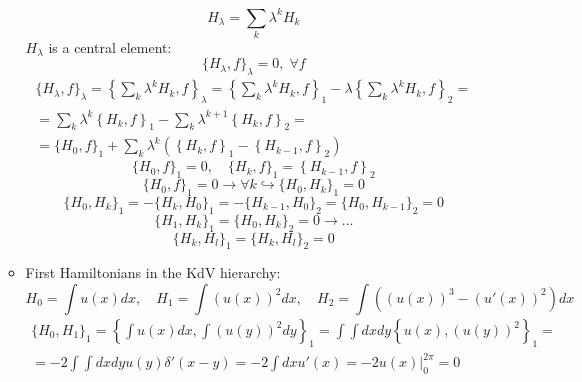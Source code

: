 \documentclass[12pt]{article}
\theoremstyle{definition}
\begin{document}
\begin{enumerate}
\begin{itemize}
\begin{equation}
        \end{equation}
        \begin{equation}
            H_\lambda=\sum\limits_k\lambda^kH_k
        \end{equation}
        $H_\lambda$ is a central element:
        \begin{equation}
            \{H_\lambda,f\}_\lambda= 0,\;\forall f
        \end{equation}
        \begin{multline}
            \{H_\lambda,f\}_\lambda=\left\{\sum_{k}\lambda^k H_k ,f\right\}_\lambda=\left\{\sum_{k}\lambda^k H_k ,f\right\}_1-\lambda\left\{\sum_{k}\lambda^k H_k ,f\right\}_2=\\=\sum_{k}\lambda^k\left\{ H_k ,f\right\}_1-\sum_{k}\lambda^{k+1}\left\{ H_k ,f\right\}_2=\\=\{H_0,f\}_1+\sum_{k}\lambda^k(\left\{ H_k ,f\right\}_1-\left\{ H_{k-1} ,f\right\}_2)
        \end{multline}
        \begin{equation}
            \boxed{\{H_0,f\}_1=0,\quad\{H_k,f\}_1=\left\{H_{k-1} ,f\right\}_2}
        \end{equation}
        \begin{equation}
            \{H_0,f\}_1=0\rightarrow\forall k\hookrightarrow\{H_0,H_k\}_1=0
        \end{equation}
        \begin{equation}
            \{H_0,H_k\}_1=-\{H_k,H_0\}_1=-\{H_{k-1},H_0\}_2=\{H_0,H_{k-1}\}_2=0
        \end{equation}
        \begin{equation}
            \{H_1,H_k\}_1=\{H_0,H_k\}_2=0\rightarrow...
        \end{equation}
        \begin{equation}
            \boxed{\{H_k,H_l\}_1=\{H_k,H_l\}_2=0}
        \end{equation}
        \item First Hamiltonians in the KdV hierarchy:
        \begin{equation}
            H_0=\int u(x)dx,\quad H_1=\int (u(x))^2dx,\quad H_2=\int((u(x))^3-(u'(x))^2)dx
        \end{equation}
        \begin{multline}
            \{H_0,H_1\}_1=\left\{\int u(x)dx,\int(u(y))^2dy\right\}_1=\int\int dxdy\left\{u(x),(u(y))^2\right\}_1=\\=-2\int\int dxdyu(y)\delta'(x-y)=-2\int dxu'(x)=-2u(x)|_0^{2\pi}=0

\end{multline}
\end{itemize}
\end{enumerate}
\end{document}
